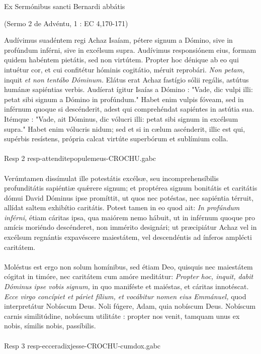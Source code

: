 \documentclass[options]{article}
\begin{document}
	Ex Sermónibus sancti Bernardi abbátis
	\begin{flushright}
		(Sermo 2 de Advéntu, 1 : EC 4,170-171)
	\end{flushright}
Audívimus suadéntem regi Achaz Isaíam, pétere signum a Dómino, sive in profúndum inférni, sive in excélsum supra. Audívimus responsiónem eius, formam quidem habéntem pietátis, sed non virtútem. Propter hoc dénique ab eo qui intuétur cor, et cui confitétur hóminis cogitátio, méruit reprobári. 
\emph{Non petam,} inquit
\emph{et non tentábo Dóminum.}
Elátus erat Achaz fastígio sólii regális, astútus humánæ sapiéntias verbis. Audíerat ígitur Isaías a Dómino : "Vade, dic vulpi illi: petat sibi signum a Dómino in profúndum." Habet enim vulpis fóveam, sed in inférnum quoque si descénderit, adest qui comprehéndat sapiéntes in astútia sua. Itémque : "Vade, ait Dóminus, dic vólucri illi: petat sibi signum in excélsum supra." Habet enim vólucris nidum; sed et si in cælum ascénderit, illic est qui, supérbis resístens, própria calcat virtúte superbórum et sublímium colla.\\
\\
Resp 2 resp-attenditepopulemeus-CROCHU.gabc  \\
\\
Verúmtamen dissímulat ille potestátis excélsæ, seu incomprehensíbilis profunditátis sapiéntiæ qu\'{æ}rere signum; et proptérea signum bonitátis et caritátis dómui David Dóminus ipse promíttit, ut quos nec potéstas, nec sapiéntia térruit, allídat saltem exhibítio caritátis. Potest tamen in eo quod ait:
\emph{In profúndum inférni,} étiam cáritas ipsa, qua maiórem nemo hábuit, ut in inférnum quoque pro amícis moriéndo descénderet, non immérito designári; ut præcipiátur Achaz vel in excélsum regnántis expavéscere maiestátem, vel descendéntis ad ínferos amplécti caritátem.\\
\\
Moléstus est ergo non solum homínibus, sed étiam Deo, quisquis nec maiestátem cógitat in timóre, nec caritátem cum amóre meditátur: 
\emph{Propter hoc, inquit, dabit Dóminus ipse vobis signum,}
	in quo maniféste et maiéstas, et cáritas innotéscat.
	\emph{Ecce virgo concípiet et páriet fílium, et vocábitur nomen eius Emmánuel,}
quod interpretátur Nobíscum Deus. Noli fúgere, Adam, quia nobíscum Deus. Nobíscum carnis similitúdine, nobíscum utilitáte : propter nos venit, tamquam unus ex nobis, símilis nobis, passíbilis.\\
\\
Resp 3   resp-ecceradixjesse-CROCHU-cumdox.gabc
\end{document}
